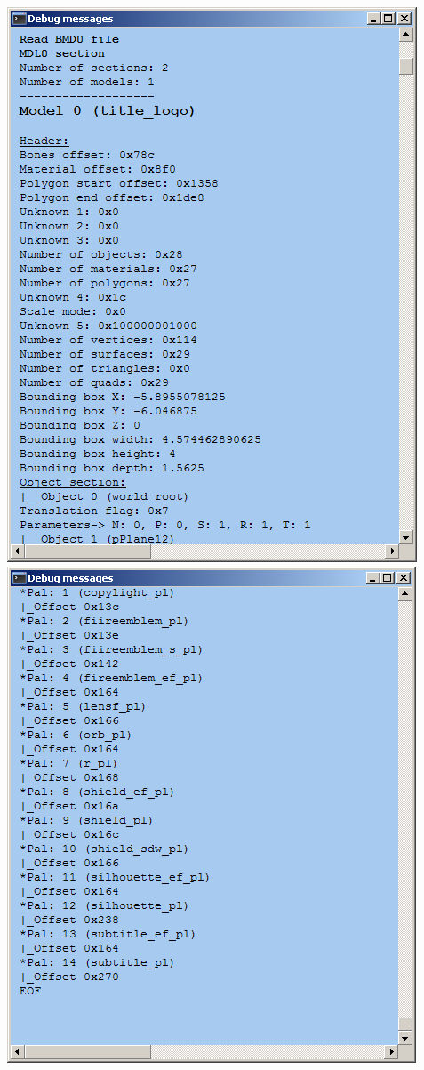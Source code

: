 \documentclass[
]{book}
\begin{document}
\includegraphics{images/71_home_fast6191_romhackingguide_unrenamed_file___gguidegraphics3dminorNSMBDtexturedecoding_3.png}\includegraphics{images/72_home_fast6191_romhackingguide_unrenamed_file___gguidegraphics3dminorNSMBDtexturedecoding_4.png}
\end{document}
